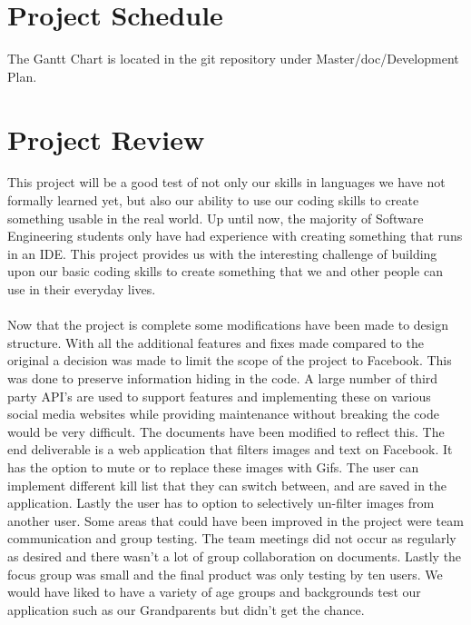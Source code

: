 \documentclass{article}
\begin{document}
\section{Project Schedule}
The Gantt Chart is located in the git repository under Master/doc/Development Plan.
\section{Project Review}
This project will be a good test of not only our skills in languages we have not formally learned yet, but also our ability to use our coding skills to create something usable in the real world. Up until now, the majority of Software Engineering students only have had experience with creating something that runs in an IDE. This project provides us with the interesting challenge of building upon our basic coding skills to create something that we and other people can use in their everyday lives. \\
\\
Now that the project is complete some modifications have been made to design structure. With all the additional features and fixes made compared to the original a decision was made to limit the scope of the project to Facebook. This was done to preserve information hiding in the code. A large number of third party API's are used to support features and implementing these on various social media websites while providing maintenance without breaking the code would be very difficult. The documents have been modified to reflect this. The end deliverable is a web application that filters images and text on Facebook. It has the option to mute or to replace these images with Gifs. The user can implement different kill list that they can switch between, and are saved in the application. Lastly the user has to option to selectively un-filter images from another user. Some areas that could have been improved in the project were team communication and group testing. The team meetings did not occur as regularly as desired and there wasn't a lot of group collaboration on documents. Lastly the focus group was small and the final product was only testing by ten users. We would have liked to have a variety of age groups and backgrounds test our application such as our Grandparents but didn't get the chance.
\end{document}
